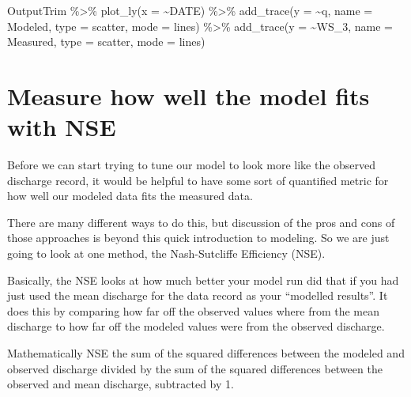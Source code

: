 \documentclass[
]{book}
\newenvironment{Shaded}{\begin{snugshade}}{\end{snugshade}}
\newcommand{\AttributeTok}[1]{\textcolor[rgb]{0.77,0.63,0.00}{#1}}
\newcommand{\FunctionTok}[1]{\textcolor[rgb]{0.00,0.00,0.00}{#1}}
\newcommand{\NormalTok}[1]{#1}
\newcommand{\SpecialCharTok}[1]{\textcolor[rgb]{0.00,0.00,0.00}{#1}}
\newcommand{\StringTok}[1]{\textcolor[rgb]{0.31,0.60,0.02}{#1}}
\begin{document}
\begin{Shaded}
\begin{Highlighting}[]
\NormalTok{OutputTrim }\SpecialCharTok{\%\textgreater{}\%} \FunctionTok{plot\_ly}\NormalTok{(}\AttributeTok{x =} \SpecialCharTok{\textasciitilde{}}\NormalTok{DATE) }\SpecialCharTok{\%\textgreater{}\%} 
        \FunctionTok{add\_trace}\NormalTok{(}\AttributeTok{y =} \SpecialCharTok{\textasciitilde{}}\NormalTok{q, }\AttributeTok{name =} \StringTok{\textquotesingle{}Modeled\textquotesingle{}}\NormalTok{,  }\AttributeTok{type =} \StringTok{\textquotesingle{}scatter\textquotesingle{}}\NormalTok{, }\AttributeTok{mode =} \StringTok{\textquotesingle{}lines\textquotesingle{}}\NormalTok{) }\SpecialCharTok{\%\textgreater{}\%} 
        \FunctionTok{add\_trace}\NormalTok{(}\AttributeTok{y =} \SpecialCharTok{\textasciitilde{}}\NormalTok{WS\_3, }\AttributeTok{name =} \StringTok{\textquotesingle{}Measured\textquotesingle{}}\NormalTok{,  }\AttributeTok{type =} \StringTok{\textquotesingle{}scatter\textquotesingle{}}\NormalTok{, }\AttributeTok{mode =} \StringTok{\textquotesingle{}lines\textquotesingle{}}\NormalTok{)}
\end{Highlighting}
\end{Shaded}

\hypertarget{measure-how-well-the-model-fits-with-nse}{%
\section{Measure how well the model fits with NSE}\label{measure-how-well-the-model-fits-with-nse}}

Before we can start trying to tune our model to look more like the observed discharge record, it would be helpful to have some sort of quantified metric for how well our modeled data fits the measured data.

There are many different ways to do this, but discussion of the pros and cons of those approaches is beyond this quick introduction to modeling. So we are just going to look at one method, the Nash-Sutcliffe Efficiency (NSE).

Basically, the NSE looks at how much better your model run did that if you had just used the mean discharge for the data record as your ``modelled results''. It does this by comparing how far off the observed values where from the mean discharge to how far off the modeled values were from the observed discharge.

Mathematically NSE the sum of the squared differences between the modeled and observed discharge divided by the sum of the squared differences between the observed and mean discharge, subtracted by 1.
\end{document}
